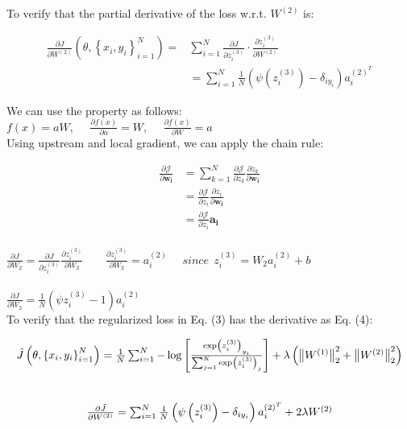 \documentclass[
	12pt, %
]{fphw}
\begin{document}
To verify that the partial derivative of the loss w.r.t. $W^{(2)}$ is:

$$
\begin{aligned}
\frac{\partial J}{\partial W^{(2)}}\left(\theta,\left\{x_{i}, y_{i}\right\}_{i=1}^{N}\right)=& \sum_{i=1}^{N} \frac{\partial J}{\partial z_{i}^{(3)}} \cdot \frac{\partial z_{i}^{(3)}}{\partial W^{(2)}} \\
&=\sum_{i=1}^{N} \frac{1}{N}\left(\psi\left(z_{i}^{(3)}\right)-\delta_{i y_{i}}\right) a_{i}^{(2)^{T}}
\end{aligned}
$$

We can use the property as follows:\\ 


$f(x) = aW, \ \ \ \ \ \ \frac{\partial f(x)}{\partial a} = W,\ \ \ \ \ \ \frac{\partial f(x)}{\partial W} = a$\\

Using upstream and local gradient, we can apply the chain rule:


\begin{align*}
\frac{\partial\mathcal{J}}{\partial \boldsymbol{w_i}} &= \sum_{k=1}^N \frac{\partial\mathcal{J}}{\partial z_k}\frac{\partial z_k}{\partial \boldsymbol{w_i}}\\
&= \frac{\partial\mathcal{J}}{\partial z_i}\frac{\partial z_i}{\partial \boldsymbol{w_i}}\\
&= \frac{\partial\mathcal{J}}{\partial z_i}\boldsymbol{a_i}\\
\end{align*} 


$\frac{\partial J}{\partial W_2} = \frac{\partial J}{\partial z_{i}^{(3)}} \frac{\partial z_{i}^{(3)}}{\partial W_2} \ \ \ \ \ \ \ \ \ \frac{\partial z_{i}^{(3)}}{\partial W_2} = a_{i}^{(2)} \ \ \ \ \ \ since \ \  z_{i}^{(3)} = W_2 a_{i}^{(2)} + b $\\ \\

$\frac{\partial J}{\partial W_2} = \frac{1}{N} (\psi z_{i}^{(3)} - 1) a_{i}^{(2)}$\\

To verify that the regularized loss in Eq. (3) has the derivative as Eq. (4):


\begin{equation}
\begin{gathered}
$$
\tilde{J}\left(\theta,\left\{x_{i}, y_{i}\right\}_{i=1}^{N}\right)=\frac{1}{N} \sum_{i=1}^{N}-\log \left[\frac{\exp \left(z_{i}^{(3)}\right)_{y_{i}}}{\sum_{j=1}^{K} \exp \left(z_{i}^{(3)}\right)_{j}}\right]+\lambda\left(\left\|W^{(1)}\right\|_{2}^{2}+\left\|W^{(2)}\right\|_{2}^{2}\right)
$$
\end{gathered}
\end{equation}
\\
\begin{equation}
\begin{gathered}
$$
\frac{\partial \tilde{J}}{\partial W^{(2)}}=\sum_{i=1}^{N} \frac{1}{N}\left(\psi\left(z_{i}^{(3)}\right)-\delta_{i y_{i}}\right) a_{i}^{(2)^{T}}+2 \lambda W^{(2)}
$$
\end{gathered}
\end{equation}
\end{document}
